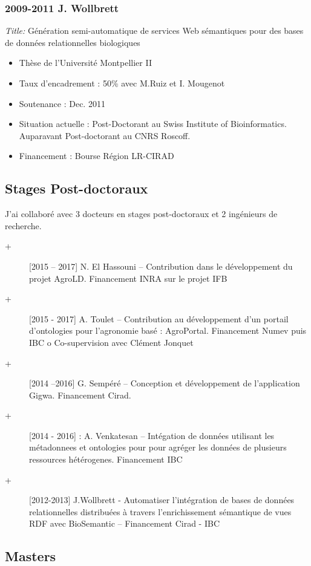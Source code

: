 \subsubsection*{2009-2011 J. Wollbrett}
\textit{Title:} Génération semi-automatique de services Web sémantiques pour des bases de données relationnelles biologiques

\begin{itemize}
\item Thèse de l’Université Montpellier II
\item Taux d’encadrement : 50\% avec M.Ruiz et I. Mougenot
\item Soutenance : Dec. 2011
\item Situation actuelle : Post-Doctorant au Swiss Institute of Bioinformatics. Auparavant Post-doctorant au CNRS Roscoff.
\item Financement : Bourse Région LR-CIRAD

\end{itemize}


\subsection*{Stages Post-doctoraux}

J’ai collaboré avec 3 docteurs en stages post-doctoraux et 2 ingénieurs de recherche.
\begin{description}
\item [+] [2015 – 2017] N. El Hassouni – Contribution dans le développement du projet AgroLD. Financement INRA sur le projet IFB 
\item [+] [2015 - 2017] A. Toulet – Contribution au développement d’un portail d’ontologies pour l’agronomie basé : AgroPortal. Financement Numev puis IBC
o	Co-supervision avec Clément Jonquet
\item [+] [2014 –2016] G. Sempéré – Conception et développement de l’application Gigwa. Financement Cirad.
\item [+] [2014 - 2016] : A. Venkatesan – Intégation de données utilisant les métadonnees et ontologies pour pour agréger les données de plusieurs ressources hétérogenes. Financement IBC
\item [+] [2012-2013] J.Wollbrett - Automatiser l’intégration de bases de données relationnelles distribuées à travers l’enrichissement sémantique de vues RDF avec BioSemantic – Financement Cirad - IBC
\end{description}

\subsection*{Masters }

